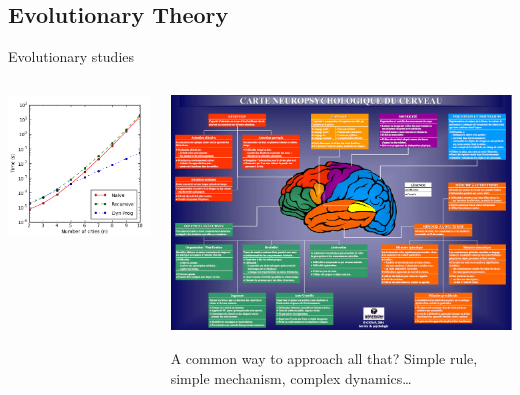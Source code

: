 \documentclass[8pt, handout=show,notes=show]{beamer}
\begin{document}
\subsection{Evolutionary Theory}

\begin{frame}{Evolutionary studies}
	\begin{center}
		
	\end{center}
    \begin{columns}
	    \begin{column}{.2\textwidth}
		    \includegraphics[width=.9\textwidth]{images/tsp.png}
	    \end{column}
	    \begin{column}{.6\textwidth}
		    \begin{center}
			    \includegraphics[width=.4\textwidth]{images/cogscience.jpg}
		    \end{center}
		    \begin{exampleblock}{A common way to approach all that?}
			    Simple rule, simple mechanism, complex dynamics\ldots\\

\end{exampleblock}
\end{column}
\end{columns}
\end{frame}
\end{document}

